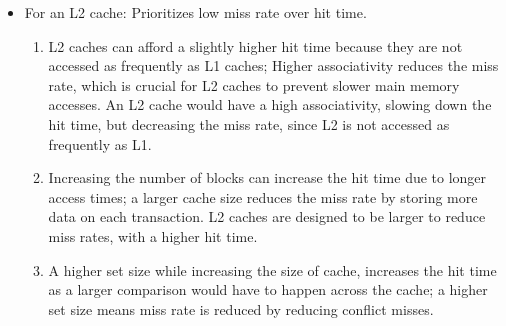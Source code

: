 \documentclass{article}
\begin{document}
\begin{enumerate}
\begin{itemize}
\begin{enumerate}
		\end{enumerate}
		\item For an L2 cache: Prioritizes low miss rate over hit time.
		\begin{enumerate}
			\item  L2 caches can afford a slightly higher hit time because they are not accessed as frequently as L1 caches; Higher associativity reduces the miss rate, which is crucial for L2 caches to prevent slower main memory accesses. An L2 cache would have a high associativity, slowing down the hit time, but decreasing the miss rate, since L2 is not accessed as frequently as L1. 
			\item Increasing the number of blocks can increase the hit time due to longer access times; a larger cache size reduces the miss rate by storing more data on each transaction. L2 caches are designed to be larger to reduce miss rates, with a higher hit time.
			\item A higher set size while increasing the size of cache, increases the hit time as a larger comparison would have to happen across the cache; a higher set size means miss rate is reduced by reducing conflict misses.
		\end{enumerate}
	\end{itemize}
\end{enumerate}
\newpage
\end{document}
